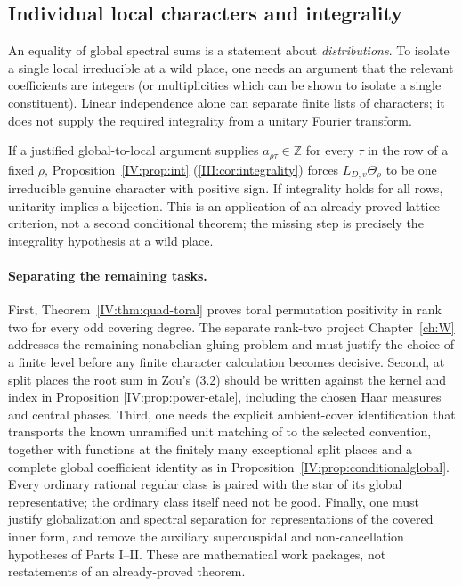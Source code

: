 \subsection{Individual local characters and integrality}
An equality of global spectral sums is a statement about
\emph{distributions}.  To isolate a single local irreducible at a
wild place, one needs an argument that the relevant coefficients
are integers (or multiplicities which can be shown to isolate a
single constituent).  Linear independence alone can separate
finite lists of characters; it does not supply the required
integrality from a unitary Fourier transform.

\begin{remark}
If a justified global-to-local argument supplies
$a_{\rho\tau}\in\mathbb Z$ for every $\tau$ in the row of a fixed
$\rho$, Proposition~\ref{IV:prop:int} (\cref{III:cor:integrality})
forces $L_{D,v}\Theta_\rho$ to be one irreducible genuine
character with positive sign.  If integrality holds for all
rows, unitarity implies a bijection.  This is an application of
an already proved lattice criterion, not a second conditional
theorem; the missing step is precisely the integrality
hypothesis at a wild place.
\end{remark}

\paragraph{Separating the remaining tasks.}
First, Theorem~\ref{IV:thm:quad-toral} proves toral permutation
positivity in rank two for every odd covering degree.  The separate
rank-two project Chapter~\ref{ch:W} addresses the remaining nonabelian
gluing problem and must justify the choice of a finite level before
any finite character calculation becomes decisive.  Second, at split
places the root sum in Zou's (3.2) should be written against the
kernel and index in Proposition \ref{IV:prop:power-etale}, including
the chosen Haar measures and central phases.  Third, one needs the explicit ambient-cover identification
that transports the known unramified unit matching of
\cite[\S12]{FK86} to the selected convention, together with
functions at the finitely many exceptional split places and a
complete global coefficient identity as in
Proposition~\ref{IV:prop:conditionalglobal}. Every ordinary rational regular class is paired with the star of
its global representative; the ordinary class itself need not be
good.
Finally, one must justify globalization and spectral separation
for representations of the covered inner form, and remove the
auxiliary supercuspidal and non-cancellation hypotheses of Parts
I--II.  These are mathematical work packages, not restatements of
an already-proved theorem.
\endgroup
